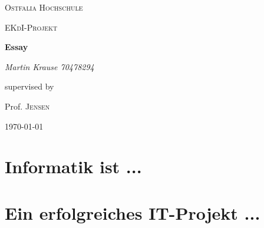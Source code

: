 \documentclass[12pt]{scrartcl}
\begin{document}
\begin{titlepage}
	\centering
	{\scshape\LARGE Ostfalia Hochschule \par}
	\vspace{1cm}
	{\scshape\Large EKdI-Projekt\par}
	\vspace{1.5cm}
	{\huge\bfseries Essay\par}
	\vspace{2cm}
	{\Large\itshape Martin Krause 70478294\par}
	\vfill
	supervised by\par
	Prof. \textsc{Jensen}

	\vfill

	{\large \today\par}
\end{titlepage}



\section{Informatik ist ...}

\newpage

\section{Ein erfolgreiches IT-Projekt ...}



 
\end{document}
